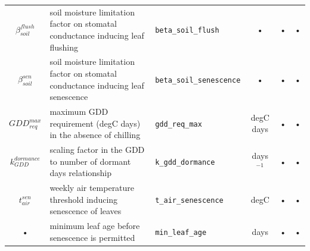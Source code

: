 \begin{table}
\begin{tabularx}{\linewidth}{|c|X|l|c|c|c|}
$\beta_{soil}^{flush}$ & soil moisture limitation factor on stomatal conductance inducing leaf flushing & \texttt{beta\_soil\_flush} & • & • & • \\
$\beta_{soil}^{sen}$ & soil moisture limitation factor on stomatal conductance inducing leaf senescence & \texttt{beta\_soil\_senescence} & • & • & • \\
$GDD_{req}^{max}$ & maximum GDD requirement (degC days) in the absence of chilling & \texttt{gdd\_req\_max} & degC days & • & • \\
$k_{GDD}^{dormance} $ & scaling factor in the GDD to number of dormant days relationship & \texttt{k\_gdd\_dormance} & days$^{-1}$ & • & • \\
$t_{air}^{sen} $ & weekly air temperature threshold inducing senescence of leaves & \texttt{t\_air\_senescence} & degC & • & • \\
 • & minimum leaf age before senescence is permitted & \texttt{min\_leaf\_age} & days & • & • \\
\hline 
\end{tabularx}
\end{table}


